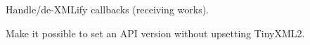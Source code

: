 
\begin{DoxyRefList}
\item[\label{todo__todo000001}%
\hypertarget{todo__todo000001}{}%
Class \hyperlink{classGbxRemote}{Gbx\-Remote} ]Handle/de-\/\-X\-M\-Lify callbacks (receiving works). 

Make it possible to set an A\-P\-I version without upsetting Tiny\-X\-M\-L2. 
\end{DoxyRefList}